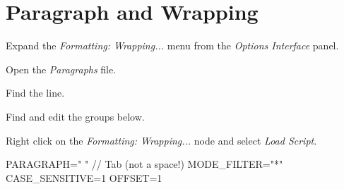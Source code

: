 \section{Paragraph and Wrapping}
\begin{numberedlist}
	\item Expand the \textit{Formatting: Wrapping...} menu from the \textit{Options Interface} panel.
	\item Open the \textit{Paragraphs} file.
	\item Find the \textcode{[PARAGRAPHS]} line.
	\item Find and edit the groups below.
	\item Right click on the \textit{Formatting: Wrapping...} node and select \textit{Load Script}.
\end{numberedlist}
\begin{code}[\codenumbering]{}
	\codeitemnonumber PARAGRAPH="	" // Tab (not a space!)
	\stepcodelevel{}
	\codeitemnonumber MODE\_FILTER="*"
	\codeitemnonumber {}
	\codeitemnonumber CASE\_SENSITIVE=1
	\codeitemnonumber OFFSET=1
	\codeitemnonumber {}
	\prevcodelevel{}
\end{code}
